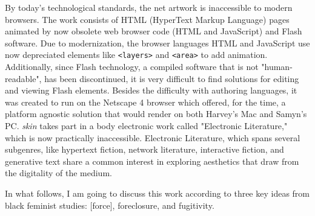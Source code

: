 \documentclass[11pt]{article}
\begin{document}
By today's technological standards, the net artwork is inaccessible to
modern browsers. The work consists of HTML (HyperText Markup Language)
pages animated by now obsolete web browser code (HTML and JavaScript)
and Flash software. Due to modernization, the browser languages HTML
and JavaScript use now depreciated elements like \texttt{<layers>} and
\texttt{<area>} to add animation. Additionally, since Flash technology, a
compiled software that is not "human-readable", has been discontinued,
it is very difficult to find solutions for editing and viewing Flash
elements. Besides the difficulty with authoring languages, it was
created to run on the Netscape 4 browser which offered, for the time,
a platform agnostic solution that would render on both Harvey's Mac
and Samyn's PC. \emph{skin} takes part in a body electronic work called
"Electronic Literature," which is now practically
inaccessible. Electronic Literature, which spans several subgenres,
like hypertext fiction, network literature, interactive fiction, and
generative text share a common interest in exploring aesthetics that
draw from the digitality of the medium.

In what follows, I am going to discuss this work according to three
key ideas from black feminist studies: [force], foreclosure, and
fugitivity.
\end{document}

